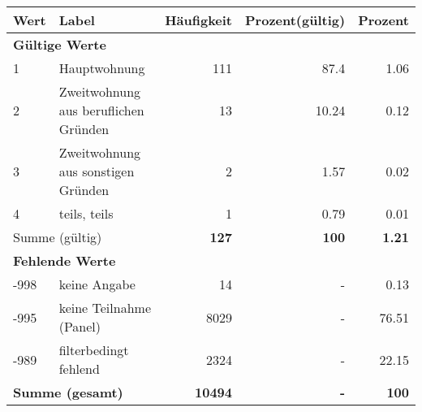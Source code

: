      \begin{longtable}{lXrrr}
     \toprule
     \textbf{Wert} & \textbf{Label} & \textbf{Häufigkeit} & \textbf{Prozent(gültig)} & \textbf{Prozent} \\
     \endhead
     \midrule
     \multicolumn{5}{l}{\textbf{Gültige Werte}}\\

     1 &
     \multicolumn{1}{X}{ Hauptwohnung   } &


       \num{111} &
       \num[round-mode=places,round-precision=2]{87.4} &
         \num[round-mode=places,round-precision=2]{1.06} \\

     2 &
     \multicolumn{1}{X}{ Zweitwohnung aus beruflichen Gründen   } &


       \num{13} &
       \num[round-mode=places,round-precision=2]{10.24} &
         \num[round-mode=places,round-precision=2]{0.12} \\

     3 &
     \multicolumn{1}{X}{ Zweitwohnung aus sonstigen Gründen   } &


       \num{2} &
       \num[round-mode=places,round-precision=2]{1.57} &
         \num[round-mode=places,round-precision=2]{0.02} \\

     4 &
     \multicolumn{1}{X}{ teils, teils   } &


       \num{1} &
       \num[round-mode=places,round-precision=2]{0.79} &
         \num[round-mode=places,round-precision=2]{0.01} \\
     \midrule
     \multicolumn{2}{l}{Summe (gültig)} &
       \textbf{\num{127}} &
     \textbf{\num{100}} &
       \textbf{\num[round-mode=places,round-precision=2]{1.21}} \\
     \multicolumn{5}{l}{\textbf{Fehlende Werte}}\\
       -998 &
       keine Angabe &
         \num{14} &
        - &
         \num[round-mode=places,round-precision=2]{0.13} \\
       -995 &
       keine Teilnahme (Panel) &
         \num{8029} &
        - &
         \num[round-mode=places,round-precision=2]{76.51} \\
       -989 &
       filterbedingt fehlend &
         \num{2324} &
        - &
         \num[round-mode=places,round-precision=2]{22.15} \\
     \midrule
     \multicolumn{2}{l}{\textbf{Summe (gesamt)}} &
          \textbf{\num{10494}} &
        \textbf{-} &
        \textbf{\num{100}} \\
     \bottomrule
     \end{longtable}
     
